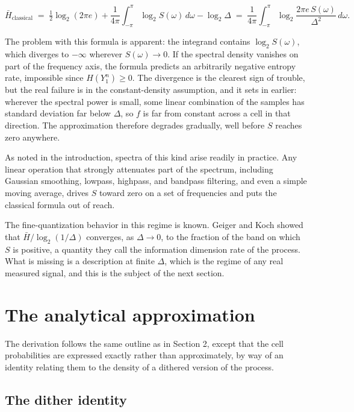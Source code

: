 \documentclass[11pt]{article}
\begin{document}
\[\bar H_{\mathrm{classical}} \;=\; \tfrac12\log_2(2\pi e) + \frac{1}{4\pi}\int_{-\pi}^{\pi}\log_2 S(\omega)\,d\omega - \log_2\Delta \;=\; \frac{1}{4\pi}\int_{-\pi}^{\pi}\log_2\frac{2\pi e\,S(\omega)}{\Delta^2}\,d\omega.\]

The problem with this formula is apparent: the integrand contains \(\log_2 S(\omega)\), which diverges to \(-\infty\) wherever \(S(\omega)\to 0\). If the spectral density vanishes on part of the frequency axis, the formula predicts an arbitrarily negative entropy rate, impossible since \(H(Y_1^n) \ge 0\). The divergence is the clearest sign of trouble, but the real failure is in the constant-density assumption, and it sets in earlier: wherever the spectral power is small, some linear combination of the samples has standard deviation far below \(\Delta\), so \(f\) is far from constant across a cell in that direction. The approximation therefore degrades gradually, well before \(S\) reaches zero anywhere.

As noted in the introduction, spectra of this kind arise readily in practice. Any linear operation that strongly attenuates part of the spectrum, including Gaussian smoothing, lowpass, highpass, and bandpass filtering, and even a simple moving average, drives \(S\) toward zero on a set of frequencies and puts the classical formula out of reach.

The fine-quantization behavior in this regime is known. Geiger and Koch \cite{GeigerKoch2019} showed that \(\bar H/\log_2(1/\Delta)\) converges, as \(\Delta \to 0\), to the fraction of the band on which \(S\) is positive, a quantity they call the information dimension rate of the process. What is missing is a description at finite \(\Delta\), which is the regime of any real measured signal, and this is the subject of the next section.

\section{The analytical approximation}\label{the-analytical-approximation}

The derivation follows the same outline as in Section 2, except that the cell probabilities are expressed exactly rather than approximately, by way of an identity relating them to the density of a dithered version of the process.

\subsection{The dither identity}\label{the-dither-identity}
\end{document}
